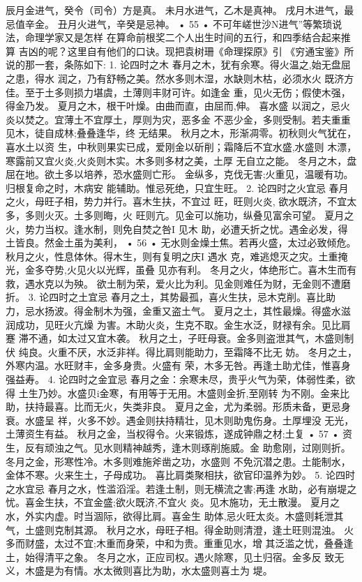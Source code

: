 辰月金进气，癸令（司令）方是真。
未月水进气，乙木是真神。
戌月木进气，最忌值辛金。
丑月火进气，辛癸是忌神。
• 55 •
不可年嵯世沙N进气”等繁琐说法，命理学家又是怎样
在算命前根奖二个人出生时间的五行，和四季结合起来推算
吉凶的呢？这里自有他们的口诀。现把袁树珊《命理探原》引
《穷通宝鉴》所说的那一套，条陈如下:
1. 论四时之木
春月之木，犹有余寒。得火温之,始无盘屈之患，得水
润之，乃有舒畅之美。然水多则木湿，水缺则木枯，必须水火
既济方佳。至于土多则损力堪虞，土薄则丰财可许。如逢金
重，见火无伤；假使木强，得金乃发。
夏月之木，根干叶燥。由曲而直，由屈而,伸。 喜水盛
以润之，忌火炎以焚之。宜薄土不宜厚土，厚则为灾，恶多金
不恶少金，多则受制。若夫重重见木，徒自成林;叠叠逢华，终
无结果。
秋月之木，形渐凋零。初秋则火气犹在，喜水土以资
生，中秋则果实已成，爱刚金以斫削；霜降后不宜水盛,水盛则
木漂，寒露前又宜火炎,火炎则木实。木多则多材之美，土厚
无自立之能。
冬月之木，盘屈在地。欲土多以培养，恐水盛则亡形。
金纵多，克伐无害;火重见，温暖有功。归根复命之时，木病安
能辅助。惟忌死绝，只宜生旺。
2. 论四时之火宜忌
春月之火，母旺子相，势力并行。喜木生扶，不宜过
旺，旺则火炎, 欲水既济，不宜太多，多则火灭。土多则晦，火
旺则亢。见金可以施功，纵叠见富余可望。
夏月之火，势力当权。逢水制，则免自焚之咎I 见木
助，必遭夭折之忧。遇金必发，得土皆良。然金土虽为美利，
• 56 •
无水则金燥土焦。若再火盛，太过必致倾危。
秋月之火，性息体休。得木生，则有复明之庆I 遇水
克，难逃熄灭之灾。土重掩光，金多夺势,火见火以光辉，虽叠
见亦有利。
冬月之火，体绝形亡。喜木生而有救，遇水克以为殃。
欲土制为荣，爱火比为利。见金则难任为财，无金则不遭磨
折。
3. 论四时之土宜忌
春月之土，其势最孤，喜火生扶，忌木克削。喜比助
力，忌水扬波。得金制木为强，金重又盗土气。
夏月之土，其性最燥。得盛水滋润成功，见旺火亢燥
为害。木助火炎，生克不取。金生水泛，财禄有余。见比肩蹇
滞不通，如太过又宜木袭。
秋月之土，子旺母衰。金多则盗泄其气，木盛则制伏
纯良。火重不厌，水泛非祥。得比肩则能助力，至霜降不比无
妨。
冬月之土，外寒内温。水旺财丰，金多身贵。火盛有
荣，木多无咎。再逢土助尤佳，惟喜身强益寿。
4. 论四时之金宜忌
春月之金：余寒未尽，贵乎火气为荣，体弱性柔，欲得
土生乃妙。水盛贝i金寒，有用等于无用。木盛则金折,至刚转
为不刚。金来比助，扶持最喜。比而无火，失类非良。
夏月之金，尤为柔弱。形质未备，更忌身衰。水盛呈
祥，火多不妙。遇金则扶持精壮，见木则助鬼伤身。土厚埋没
无光，土薄资生有益。
秋月之金，当权得令。火来锻炼，遂成钟鼎之材;土复
• 57 •
资生，反有顽浊之气。见水则精神越秀，逢木则琢削施威。金
助愈刚，过刚则折。
冬月之金，形寒性冷。木多则难施斧凿之功，水盛则
不免沉潜之患。土能制水，金体不寒。火来生土，子母成功。
喜比肩类聚相扶，欲官印温养为妙。
5. 论四时之水宜忌
春月之水，性滥滔淫。若逢土制，则无横流之害;再逢
水助，必有崩堤之忧。喜金生扶，不宜金盛;欲火既济,不宜火
炎。见木施功，无土散漫。
夏月之水，外实内虚。时当涸际，欲得比肩。喜金生
助体,忌火旺太炎。木盛则耗泄其气，土盛则克制其源。
秋月之水，母旺子相。得金助则清澄，逢土旺则混浊。
火多而财盛，太过不宜;木重而身荣，中和为贵。重重见水，增
其泛滥之忧，叠叠逢土，始得清平之象。
冬月之水，正应司权。遇火除寒，见土归宿。金多反
致无义，木盛是为有情。水太微则喜比为助，水太盛则喜土为
堤。

